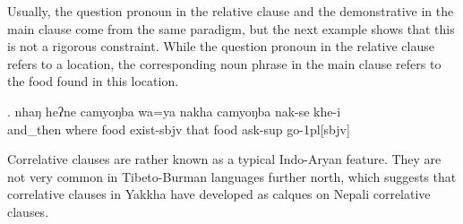 	
Usually, the question pronoun in the relative clause and the demonstrative in the main clause come from the same paradigm, but the next example shows that this is not a rigorous constraint. While the question pronoun in the relative clause refers to a location, the corresponding noun phrase in the main clause refers to the food found in this location.	
		
	\exg. nhaŋ   heʔne  camyoŋba wa=ya nakha camyoŋba nak-se khe-i\\
		and\_then where food exist{\sc [3sg]-sbjv} that  food ask-{\sc sup} go{\sc -1pl[sbjv]}\\
		 


Correlative clauses are rather known as a typical Indo-Aryan feature. They are not very common in Tibeto-Burman languages further north, which suggests that correlative clauses in Yakkha have developed as calques on Nepali correlative clauses. 
 